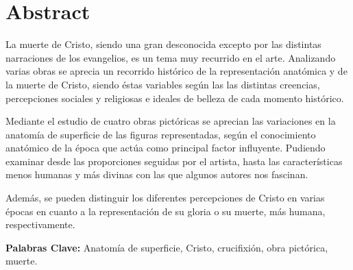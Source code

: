 \section{Abstract}
La muerte de Cristo, siendo una gran desconocida excepto por las distintas narraciones de los evangelios, es un tema muy recurrido en el arte. Analizando varias obras se aprecia un recorrido histórico de la representación anatómica y de la muerte de Cristo, siendo éstas variables según las las distintas creencias, percepciones sociales y religiosas e ideales de belleza de cada momento histórico.

Mediante el estudio de cuatro obras pictóricas se aprecian las variaciones en la anatomía de superficie de las figuras representadas, según el conocimiento anatómico de la época que actúa como principal factor influyente. Pudiendo examinar desde las proporciones seguidas por el artista, hasta las características menos humanas y más divinas con las que algunos autores nos fascinan.

Además, se pueden distinguir los diferentes percepciones de Cristo en varias épocas en cuanto a la representación de su gloria o su muerte, más humana, respectivamente.

\vspace{15pt}

\textbf{Palabras Clave:}
Anatomía de superficie, Cristo, crucifixión, obra pictórica, muerte.

